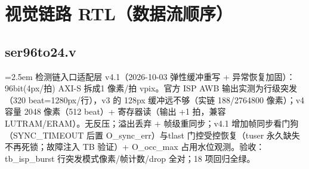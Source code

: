 \documentclass[10pt]{ctexart}
\newcommand{\fileintro}[1]{{\small\color{accent}\sloppy\emergencystretch=2.5em #1\par}\vspace{2pt}}
\begin{document}
\section{视觉链路 RTL（数据流顺序）}
\subsection{ser96to24.v}
\fileintro{检测链入口适配层 v4.1（2026-10-03 弹性缓冲重写 + 异常恢复加固）：96bit(4px/拍) AXI-S 拆成1 像素/拍 vpix。官方 ISP AWB 输出实测为行级突发（320 beat=1280px/行），v3 的 128px 缓冲远不够（实链 188/2764800 像素）；v4 容量 2048 像素（512 beat）+ 寄存器读（输出 +1 拍，兼容 LUTRAM/ERAM）。无反压；溢出丢弃 + 帧级重同步；v4.1 增加帧同步看门狗（SYNC\_TIMEOUT 后置 O\_sync\_err）与tlast 门控受控恢复（tuser 永久缺失不再死锁；故障注入 TB 验证）+ O\_occ\_max 占用水位观测。验收：tb\_isp\_burst 行突发模式像素/帧计数/drop 全对；18 项回归全绿。}
\end{document}
